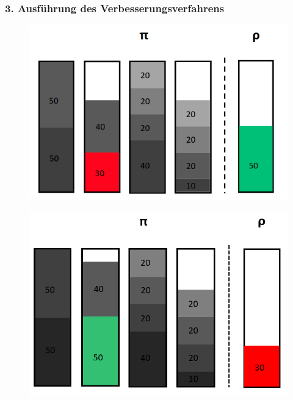 \documentclass{beamer}
\begin{document}
\begin{frame}
\frametitle{3. Ausführung des Verbesserungsverfahrens}
\begin{figure}[!htbp]
\begin{center}
\includegraphics[scale=0.25]{img/HC_1.5.png}
\end{center}
\end{figure}

\begin{figure}[!htbp]
\begin{center}
\includegraphics[scale=0.35]{img/HC_2.png}
\end{center}
\end{figure}


\end{frame}
\end{document}
